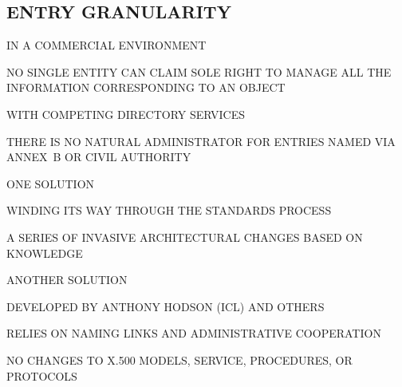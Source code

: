\begin{bwslide}
\part*	{ENTRY GRANULARITY}\bf

\begin{nrtc}
\item	IN A COMMERCIAL ENVIRONMENT
    \begin{nrtc}
    \item	NO SINGLE ENTITY CAN CLAIM SOLE RIGHT TO MANAGE ALL THE
		INFORMATION CORRESPONDING TO AN OBJECT
    \end{nrtc}

\item	WITH COMPETING DIRECTORY SERVICES
    \begin{nrtc}
    \item	THERE IS NO NATURAL ADMINISTRATOR FOR ENTRIES NAMED
		VIA ANNEX~B OR CIVIL AUTHORITY
    \end{nrtc}
\end{nrtc}
\end{bwslide}


\begin{bwslide}

\begin{nrtc}
\item	ONE SOLUTION
    \begin{nrtc}
    \item	WINDING ITS WAY THROUGH THE STANDARDS PROCESS
    \end{nrtc}

\item	A SERIES OF INVASIVE ARCHITECTURAL CHANGES BASED ON KNOWLEDGE
\end{nrtc}
\end{bwslide}


\begin{bwslide}

\begin{nrtc}
\item	ANOTHER SOLUTION
    \begin{nrtc}
    \item	DEVELOPED BY ANTHONY HODSON (ICL) AND OTHERS
    \end{nrtc}

\item	RELIES ON NAMING LINKS AND ADMINISTRATIVE COOPERATION

\item	NO CHANGES TO X.500 MODELS, SERVICE, PROCEDURES, OR PROTOCOLS
\end{nrtc}
\end{bwslide}


